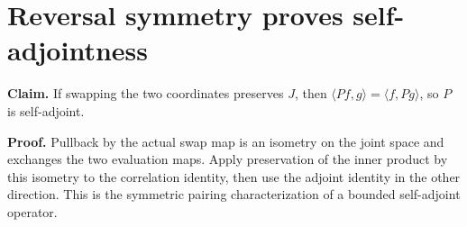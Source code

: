 \documentclass[11pt,a4paper]{article}
\begin{document}
\section{\texorpdfstring{Reversal symmetry proves self-adjointness}{Reversal symmetry proves self-adjointness}}


\textbf{Claim.} If swapping the two coordinates preserves \(J\), then \(\langle Pf,g\rangle=\langle f,Pg\rangle\), so \(P\) is self-adjoint.



\textbf{Proof.} Pullback by the actual swap map is an isometry on the joint space and exchanges the two evaluation maps. Apply preservation of the inner product by this isometry to the correlation identity, then use the adjoint identity in the other direction. This is the symmetric pairing characterization of a bounded self-adjoint operator.
\end{document}
